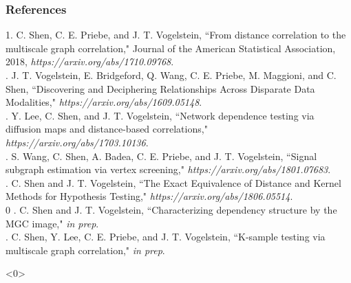 \documentclass[mathserif,t]{beamer}
\newcommand{\blind}{0}
\begin{document}
%
%

\begin{frame}%
\frametitle{References}
\small

1. \textcolor{UniOrange}{C. Shen}, C. E. Priebe, and J. T. Vogelstein, ``From distance correlation to the
multiscale graph correlation," Journal of the American Statistical Association, 2018, \textit{https://arxiv.org/abs/1710.09768}.\\
. J. T. Vogelstein, E. Bridgeford, Q. Wang, C. E. Priebe, M. Maggioni, and \textcolor{UniOrange}{C. Shen},
``Discovering and Deciphering Relationships Across Disparate Data Modalities," \textit{https://arxiv.org/abs/1609.05148}.\\
. Y. Lee, \textcolor{UniOrange}{C. Shen}, and J. T. Vogelstein, ``Network dependence testing via diffusion
maps and distance-based correlations," \textit{https://arxiv.org/abs/1703.10136}.\\
. S. Wang, \textcolor{UniOrange}{C. Shen}, A. Badea, C. E. Priebe, and J. T. Vogelstein, ``Signal
subgraph estimation via vertex screening," \textit{https://arxiv.org/abs/1801.07683}.\\
. \textcolor{UniOrange}{C. Shen} and J. T. Vogelstein, ``The Exact Equivalence of Distance and Kernel Methods for Hypothesis Testing," \textit{https://arxiv.org/abs/1806.05514}.\\
\blind
{
. \textcolor{UniOrange}{C. Shen} and J. T. Vogelstein, ``Characterizing dependency structure by the MGC image," \textit{in prep}.\\
. \textcolor{UniOrange}{C. Shen}, Y. Lee, C. E. Priebe, and J. T. Vogelstein, ``K-sample testing via
multiscale graph correlation," \textit{in prep}.
}\fi
%
%
\end{frame}

\addtocounter{framenumber}{-1} 
\begin{frame}<0> 

\end{frame} 
%

\end{document}
